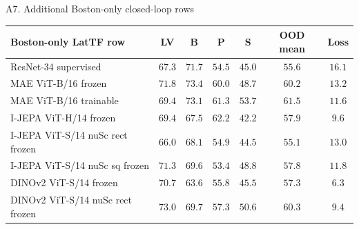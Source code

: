 \documentclass[aspectratio=169, xcolor={table}]{beamer}
\begin{document}
\begin{frame}{A7. Additional Boston-only closed-loop rows}
  \centering\scriptsize
  \begin{tabular}{@{}l c c c c c c@{}}
    \toprule
    \textbf{Boston-only LatTF row} & LV & B & P & S & OOD mean & Loss \\
    \midrule
    ResNet-34 supervised              & $67.3$ & $71.7$ & $54.5$ & $45.0$ & $55.6$ & $16.1$ \\
    MAE ViT-B/16 frozen               & $71.8$ & $73.4$ & $60.0$ & $48.7$ & $60.2$ & $13.2$ \\
    MAE ViT-B/16 trainable            & $69.4$ & $73.1$ & $61.3$ & $53.7$ & $61.5$ & $11.6$ \\
    I-JEPA ViT-H/14 frozen            & $69.4$ & $67.5$ & $62.2$ & $42.2$ & $57.9$ & $9.6$ \\
    I-JEPA ViT-S/14 nuSc rect frozen  & $66.0$ & $68.1$ & $54.9$ & $44.5$ & $55.1$ & $13.0$ \\
    I-JEPA ViT-S/14 nuSc sq frozen    & $71.3$ & $69.6$ & $53.4$ & $48.8$ & $57.8$ & $11.8$ \\
    DINOv2 ViT-S/14 frozen            & $70.7$ & $63.6$ & $55.8$ & $45.5$ & $57.3$ & $6.3$ \\
    DINOv2 ViT-S/14 nuSc rect frozen  & $73.0$ & $69.7$ & $57.3$ & $50.6$ & $60.3$ & $9.4$ \\
    \bottomrule
  \end{tabular}
\end{frame}
\end{document}
